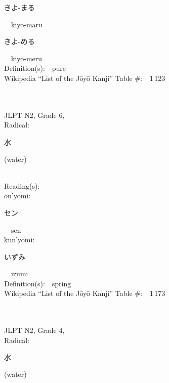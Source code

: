 \begin{multicols}{2}
{\hspace*{2em}}{\begin{CJK}{UTF8}{min} きよ-まる \end{CJK}}\ \ kiyo-maru\ \ \\
{\hspace*{2em}}{\begin{CJK}{UTF8}{min} きよ-める \end{CJK}}\ \ kiyo-meru\ \ \\
Definition(s):\ \ pure \\
Wikipedia ``List of the J\=oy\=o Kanji'' Table \#:\ \ 1\,123 \\
\ \ \\
{\fontsize{34pt}{40pt}  }\ \ \\  %
{JLPT N2, Grade 6, \\Radical:\ \ {\begin{CJK}{UTF8}{min} 水 \end{CJK}} (water) } \\
Reading(s):\ \ \\
{\hspace*{1em}}on'yomi:\ \ \\
{\hspace*{2em}}{\begin{CJK}{UTF8}{min} セン \end{CJK}}\ \ sen\ \ \\
{\hspace*{1em}}kun'yomi:\ \ \\
{\hspace*{2em}}{\begin{CJK}{UTF8}{min} いずみ \end{CJK}}\ \ izumi\ \ \\
Definition(s):\ \ spring \\
Wikipedia ``List of the J\=oy\=o Kanji'' Table \#:\ \ 1\,173 \\
\ \ \\
{\fontsize{34pt}{40pt}  }\ \ \\  %
{JLPT N2, Grade 4, \\Radical:\ \ {\begin{CJK}{UTF8}{min} 水 \end{CJK}} (water) } \\

\end{multicols}
